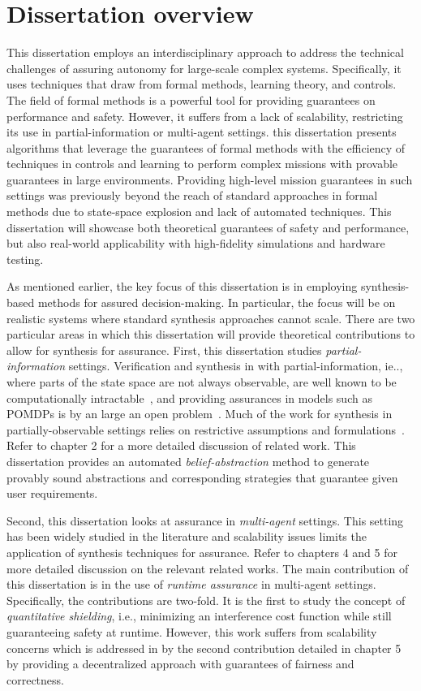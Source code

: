 \section{Dissertation overview}

This dissertation employs an interdisciplinary approach to address the technical challenges of assuring autonomy for large-scale complex systems. Specifically, it uses techniques that draw from formal methods, learning theory, and controls. The field of formal methods is a powerful tool for providing guarantees on performance and safety. However, it suffers from a lack of scalability, restricting its use in partial-information or multi-agent settings. this dissertation presents algorithms that leverage the guarantees of formal methods with the efficiency of techniques in controls and learning to perform complex missions with provable guarantees in large environments. Providing high-level mission guarantees in such settings was previously beyond the reach of standard approaches in formal methods due to state-space explosion and lack of automated techniques. This dissertation will showcase both theoretical guarantees of safety and performance, but also real-world applicability with high-fidelity simulations and hardware testing. 

As mentioned earlier, the key focus of this dissertation is in employing synthesis-based methods for assured decision-making. In particular, the focus will be on realistic systems where standard synthesis approaches cannot scale. There are two particular areas in which this dissertation will provide theoretical contributions to allow for synthesis for assurance. First, this dissertation studies \emph{partial-information} settings. Verification and synthesis in with partial-information, ie.., where parts of the state space are not always observable, are well known to be computationally intractable~\cite{Baier2009ModelCL}, and providing assurances in models such as POMDPs is by an large an open problem~\cite{partialinfoltl}. Much of the work for synthesis in partially-observable settings relies on restrictive assumptions and formulations~\cite{6426524,6426174}. Refer to chapter 2 for a more detailed discussion of related work. This dissertation provides an automated \emph{belief-abstraction} method to generate provably sound abstractions and corresponding strategies that guarantee given user requirements. 

Second, this dissertation looks at assurance in \emph{multi-agent} settings. This setting has been widely studied in the literature and scalability issues limits the application of synthesis techniques for assurance. Refer to chapters 4 and 5 for more detailed discussion on the relevant related works. The main contribution of this dissertation is in the use of \emph{runtime assurance} in multi-agent settings. Specifically, the contributions are two-fold. It is the first to study the concept of \emph{quantitative shielding}, i.e., minimizing an interference cost function while still guaranteeing safety at runtime. However, this work suffers from scalability concerns which is addressed in by the second contribution detailed in chapter 5 by providing a decentralized approach with guarantees of fairness and correctness. 

